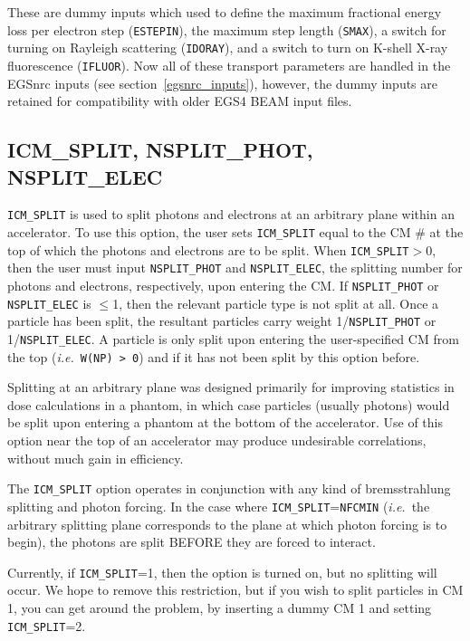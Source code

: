 \documentclass[12pt,twoside]{article}
\newcommand{\ie}{{\em i.e.}}
\begin{document}
These are dummy inputs which used to define the maximum fractional energy
loss per electron step
({\tt ESTEPIN}), the maximum step length ({\tt SMAX}),
a switch for turning on Rayleigh scattering
({\tt IDORAY}), and a switch to turn on K-shell X-ray fluorescence
({\tt IFLUOR}).  Now all of these transport parameters are
handled in the EGSnrc inputs (see section~\ref{egsnrc_inputs}), however,
the dummy inputs are retained for compatibility with older EGS4 BEAM
input files.

\subsection{ ICM\_SPLIT, NSPLIT\_PHOT, NSPLIT\_ELEC}
\label{icmsplit}

{\tt ICM\_SPLIT} is used to split photons and electrons at an arbitrary
plane within an accelerator.  To use this option, the user sets
{\tt ICM\_SPLIT} equal to the CM \# at the top of which the photons and electrons
are to be split.  When {\tt ICM\_SPLIT}$>$0, then the user must
input {\tt NSPLIT\_PHOT} and {\tt NSPLIT\_ELEC}, the splitting number for
photons
and electrons, respectively, upon entering the CM.  If
{\tt NSPLIT\_PHOT} or {\tt NSPLIT\_ELEC} is $\leq$1, then the relevant
particle type is not split at all.  Once a particle
has been split, the resultant particles carry weight
1/{\tt NSPLIT\_PHOT} or 1/{\tt NSPLIT\_ELEC}.  A particle is only split
upon entering the user-specified CM from the top (\ie\ {\tt W(NP) > 0})
and if it has not been split by this option before.

Splitting at an
arbitrary plane was designed primarily for improving statistics in
dose calculations in a phantom,
in which case particles (usually photons) would be split upon entering a
phantom at the bottom of the accelerator.  Use of this option near the
top of an accelerator may produce undesirable correlations, without much
gain in efficiency.

The {\tt ICM\_SPLIT} option operates in conjunction with any kind of
bremsstrahlung splitting and photon forcing.  In the case where
{\tt ICM\_SPLIT}={\tt NFCMIN} (\ie\ the arbitrary splitting plane corresponds
to the plane at which photon forcing is to begin), the photons are split
BEFORE they are forced to interact.

Currently, if {\tt ICM\_SPLIT}=1, then the
option is turned on, but no splitting will occur.  We  hope to remove this
restriction, but if you wish to split particles in CM 1, you can
get around the problem, by inserting a dummy CM 1 and setting
{\tt ICM\_SPLIT}=2.
\end{document}
